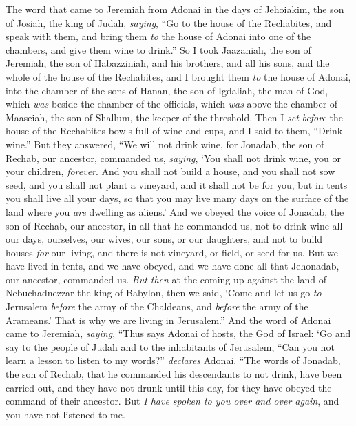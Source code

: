 \begin{biblechapter} %
 The word that came to Jeremiah from Adonai in the days of Jehoiakim, the son of Josiah, the king of Judah, \textit{saying},
\verse “Go to the house of the Rechabites, and speak with them, and bring them \textit{to} the house of Adonai into one of the chambers, and give them wine to drink.”
\verse So I took Jaazaniah, the son of Jeremiah, the son of Habazziniah, and his brothers, and all his sons, and the whole of the house of the Rechabites,
\verse and I brought them \textit{to} the house of Adonai, into the chamber of the sons of Hanan, the son of Igdaliah, the man of God, which \textit{was} beside the chamber of the officials, which \textit{was} above the chamber of Maaseiah, the son of Shallum, the keeper of the threshold.
\verse Then I \textit{set} \textit{before} the house of the Rechabites bowls full of wine and cups, and I said to them, “Drink wine.”
\verse But they answered, “We will not drink wine, for Jonadab, the son of Rechab, our ancestor, commanded us, \textit{saying}, ‘You shall not drink wine, you or your children, \textit{forever}.
\verse And you shall not build a house, and you shall not sow seed, and you shall not plant a vineyard, and it shall not be for you, but in tents you shall live all your days, so that you may live many days on the surface of the land where you \textit{are} dwelling as aliens.’
\verse And we obeyed the voice of Jonadab, the son of Rechab, our ancestor, in all that he commanded us, not to drink wine all our days, ourselves, our wives, our sons, or our daughters,
\verse and not to build houses \textit{for} our living, and there is not vineyard, or field, or seed for us.
\verse But we have lived in tents, and we have obeyed, and we have done all that Jehonadab, our ancestor, commanded us.
\verse \textit{But then} at the coming up against the land of Nebuchadnezzar the king of Babylon, then we said, ‘Come and let us go \textit{to} Jerusalem \textit{before} the army of the Chaldeans, and \textit{before} the army of the Arameans.’ That is why we are living in Jerusalem.”
\verse And the word of Adonai came to Jeremiah, \textit{saying},
\verse “Thus says Adonai of hosts, the God of Israel: ‘Go and say to the people of Judah and to the inhabitants of Jerusalem, “Can you not learn a lesson to listen to my words?” \textit{declares} Adonai.
\verse “The words of Jonadab, the son of Rechab, that he commanded his descendants to not drink, have been carried out, and they have not drunk until this day, for they have obeyed the command of their ancestor. But \textit{I have spoken to you over and over again}, and you have not listened to me.

\end{biblechapter}
